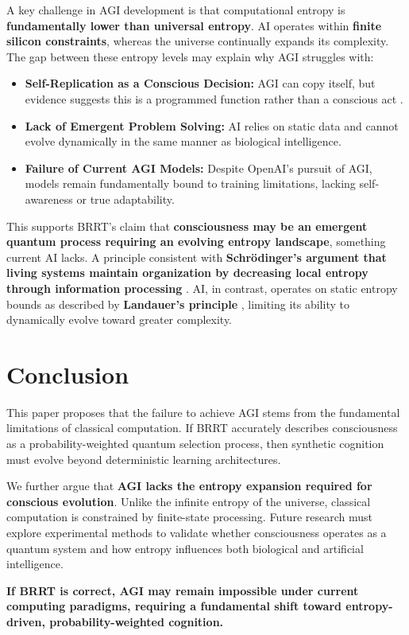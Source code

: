 \documentclass{article}
\begin{document}
A key challenge in AGI development is that computational entropy is \textbf{fundamentally lower than universal entropy}. AI operates within \textbf{finite silicon constraints}, whereas the universe continually expands its complexity. The gap between these entropy levels may explain why AGI struggles with:
\begin{itemize}
    \item \textbf{Self-Replication as a Conscious Decision:} AGI can copy itself, but evidence suggests this is a programmed function rather than a conscious act \cite{aaronson2013quantum}.
    \item \textbf{Lack of Emergent Problem Solving:} AI relies on static data and cannot evolve dynamically in the same manner as biological intelligence.
    \item \textbf{Failure of Current AGI Models:} Despite OpenAI’s pursuit of AGI, models remain fundamentally bound to training limitations, lacking self-awareness or true adaptability.
\end{itemize}

This supports BRRT’s claim that \textbf{consciousness may be an emergent quantum process requiring an evolving entropy landscape}, something current AI lacks. A principle consistent with \textbf{Schr\"odinger’s argument that living systems maintain organization by decreasing local entropy through information processing} \cite{schrodinger1944life}. AI, in contrast, operates on static entropy bounds as described by \textbf{Landauer’s principle} \cite{landauer1961irreversibility}, limiting its ability to dynamically evolve toward greater complexity.

\section{Conclusion}

This paper proposes that the failure to achieve AGI stems from the fundamental limitations of classical computation. If BRRT accurately describes consciousness as a probability-weighted quantum selection process, then synthetic cognition must evolve beyond deterministic learning architectures. 

We further argue that \textbf{AGI lacks the entropy expansion required for conscious evolution}. Unlike the infinite entropy of the universe, classical computation is constrained by finite-state processing. Future research must explore experimental methods to validate whether consciousness operates as a quantum system and how entropy influences both biological and artificial intelligence. 

\textbf{If BRRT is correct, AGI may remain impossible under current computing paradigms, requiring a fundamental shift toward entropy-driven, probability-weighted cognition.}



\end{document}
